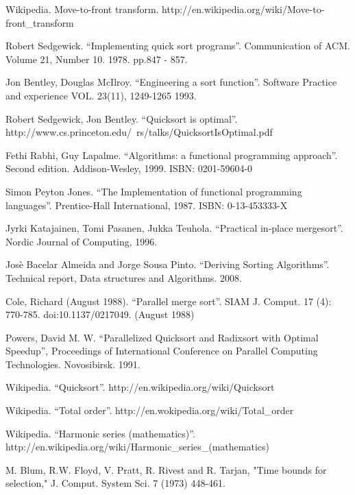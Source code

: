 \documentclass[UTF8]{article}
\begin{document}
\begin{thebibliography}{99}
Wikipedia. Move-to-front transform. http://en.wikipedia.org/wiki/Move-to-front\_transform


Robert Sedgewick. ``Implementing quick sort programs''. Communication of ACM. Volume 21, Number 10. 1978. pp.847 - 857.

Jon Bentley, Douglas McIlroy. ``Engineering a sort function''. Software Practice and experience VOL. 23(11), 1249-1265 1993.

Robert Sedgewick, Jon Bentley. ``Quicksort is optimal''. http://www.cs.princeton.edu/~rs/talks/QuicksortIsOptimal.pdf

Fethi Rabhi, Guy Lapalme. ``Algorithms: a functional programming approach''. Second edition. Addison-Wesley, 1999. ISBN: 0201-59604-0

Simon Peyton Jones. ``The Implementation of functional programming languages''. Prentice-Hall International, 1987. ISBN: 0-13-453333-X

Jyrki Katajainen, Tomi Pasanen, Jukka Teuhola. ``Practical in-place mergesort''. Nordic Journal of Computing, 1996.

Jos\`{e} Bacelar Almeida and Jorge Sousa Pinto. ``Deriving Sorting Algorithms''. Technical report, Data structures and Algorithms. 2008.

Cole, Richard (August 1988). ``Parallel merge sort''. SIAM J. Comput. 17 (4): 770-785. doi:10.1137/0217049. (August 1988)

Powers, David M. W. ``Parallelized Quicksort and Radixsort with Optimal Speedup'', Proceedings of International Conference on Parallel Computing Technologies. Novosibirsk. 1991.

Wikipedia. ``Quicksort''. http://en.wikipedia.org/wiki/Quicksort

Wikipedia. ``Total order''. http://en.wokipedia.org/wiki/Total\_order

Wikipedia. ``Harmonic series (mathematics)''. http://en.wikipedia.org/wiki/Harmonic\_series\_(mathematics)


M. Blum, R.W. Floyd, V. Pratt, R. Rivest and R. Tarjan, "Time bounds for selection," J. Comput. System Sci. 7 (1973) 448-461.


\end{thebibliography}
\end{document}
